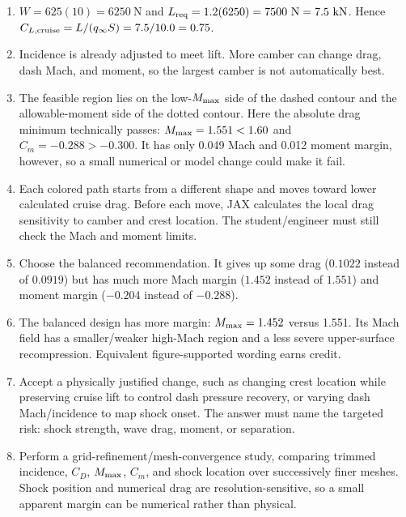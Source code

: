 \documentclass[11pt]{article}
\begin{document}
\begin{enumerate}
\item[1.] $W=625(10)=6250\ \mathrm{N}$ and $L_{\rm req}=1.2(6250)=7500\ \mathrm{N}=7.5\ \mathrm{kN}$. Hence $C_{L,\rm cruise}=L/(q_\infty S)=7.5/10.0=0.75$.
\item[2.] Incidence is already adjusted to meet lift. More camber can change drag, dash Mach, and moment, so the largest camber is not automatically best.
\item[3.] The feasible region lies on the low-$M_{\rm max}$ side of the dashed contour and the allowable-moment side of the dotted contour. Here the absolute drag minimum technically passes: $M_{\rm max}=1.551<1.60$ and $C_m=-0.288>-0.300$. It has only 0.049 Mach and 0.012 moment margin, however, so a small numerical or model change could make it fail.
\item[4.] Each colored path starts from a different shape and moves toward lower calculated cruise drag. Before each move, JAX calculates the local drag sensitivity to camber and crest location. The student/engineer must still check the Mach and moment limits.
\item[5.] Choose the balanced recommendation. It gives up some drag ($0.1022$ instead of $0.0919$) but has much more Mach margin ($1.452$ instead of $1.551$) and moment margin ($-0.204$ instead of $-0.288$).
\item[6.] The balanced design has more margin: $M_{\rm max}=1.452$ versus 1.551. Its Mach field has a smaller/weaker high-Mach region and a less severe upper-surface recompression. Equivalent figure-supported wording earns credit.
\item[7.] Accept a physically justified change, such as changing crest location while preserving cruise lift to control dash pressure recovery, or varying dash Mach/incidence to map shock onset. The answer must name the targeted risk: shock strength, wave drag, moment, or separation.
\item[8.] Perform a grid-refinement/mesh-convergence study, comparing trimmed incidence, $C_D$, $M_{\rm max}$, $C_m$, and shock location over successively finer meshes. Shock position and numerical drag are resolution-sensitive, so a small apparent margin can be numerical rather than physical.
\end{enumerate}
\end{document}
